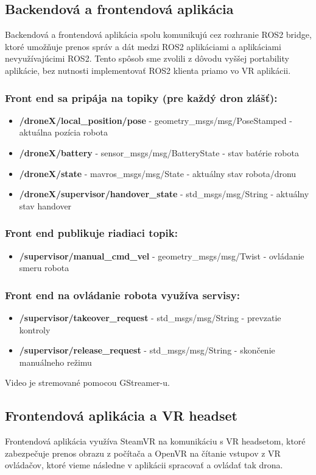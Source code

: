 \documentclass[a4paper,12pt]{article}
\begin{document}
\subsection{Backendová a frontendová aplikácia}

Backendová a frontendová aplikácia spolu komunikujú cez rozhranie ROS2 bridge, 
ktoré umožňuje prenos správ a dát medzi ROS2 aplikáciami a aplikáciami nevyužívajúcimi ROS2.
Tento spôsob sme zvolili z dôvodu vyššej portability aplikácie, bez nutnosti implementovať ROS2 klienta priamo vo VR aplikácii.

\subsubsection*{Front end sa pripája na topiky (pre každý dron zlášť):}

\begin{itemize}
    \item \textbf{/droneX/local\_position/pose} - geometry\_msgs/msg/PoseStamped - aktuálna pozícia robota
    \item \textbf{/droneX/battery} - sensor\_msgs/msg/BatteryState - stav batérie robota
    \item \textbf{/droneX/state} - mavros\_msgs/msg/State - aktuálny stav robota/dronu
    \item \textbf{/droneX/supervisor/handover\_state} - std\_msgs/msg/String - aktuálny stav handover
\end{itemize}

\subsubsection*{Front end publikuje riadiaci topik:}

\begin{itemize}
    \item \textbf{/supervisor/manual\_cmd\_vel} - geometry\_msgs/msg/Twist - ovládanie smeru robota
\end{itemize}

\subsubsection*{Front end na ovládanie robota využíva servisy:} 

\begin{itemize}
    \item \textbf{/supervisor/takeover\_request} - std\_msgs/msg/String - prevzatie kontroly
    \item \textbf{/supervisor/release\_request} - std\_msgs/msg/String - skončenie manuálneho režimu
\end{itemize}

Video je stremované pomocou GStreamer-u. 

\subsection{Frontendová aplikácia a VR headset}

Frontendová aplikácia využíva SteamVR na komunikáciu s VR headsetom, ktoré zabezpečuje prenos obrazu z počítača
a OpenVR na čítanie vstupov z VR ovládačov, ktoré vieme následne v aplikácii spracovať a ovládať tak drona. 
\end{document}
